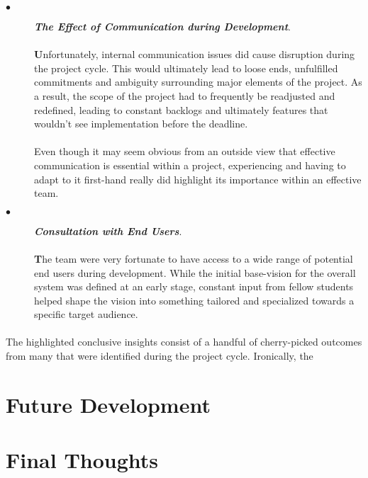 \begin{description}
  \item[$\bullet$] \textit{\textbf{The Effect of Communication during Development}}.
  
  \paragraph{}
  \textbf{U}nfortunately, internal communication issues did cause disruption during the project cycle. This would ultimately lead to loose ends, unfulfilled commitments and ambiguity surrounding major elements of the project. As a result, the scope of the project had to frequently be readjusted and redefined, leading to constant backlogs and ultimately features that wouldn't see implementation before the deadline. 
  
  \paragraph{}
  Even though it may seem obvious from an outside view that effective communication is essential within a project, experiencing and having to adapt to it first-hand really did highlight its importance within an effective team. 
  
  \item[$\bullet$] \textit{\textbf{Consultation with End Users}}.
  
  \paragraph{}
  \textbf{T}he team were very fortunate to have access to a wide range of potential end users during development. While the initial base-vision for the overall system was defined at an early stage, constant input from fellow students helped shape the vision into something tailored and specialized towards a specific target audience.
\end{description}

\paragraph{}
The highlighted conclusive insights consist of a handful of cherry-picked outcomes from many that were identified during the project cycle. Ironically, the 

\section{Future Development}


\section{Final Thoughts}